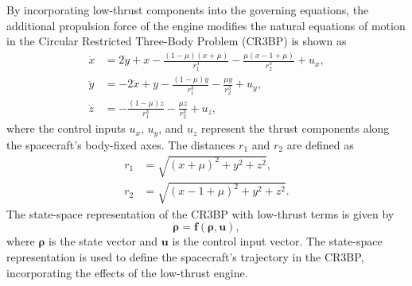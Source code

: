 \documentclass[conference]{IEEEtran}
\begin{document}
 By incorporating low-thrust components into the governing equations, the additional propulsion force of the engine modifies the natural equations of motion in the Circular Restricted Three-Body Problem (CR3BP) is shown as	
\begin{align}
		\ddot{x} &= 2\dot{y} + x - \frac{(1-\mu)(x+\mu)}{r_1^3} - \frac{\mu(x-1+\mu)}{r_2^3} + u_x, \\
		\ddot{y} &= -2\dot{x} + y - \frac{(1-\mu)y}{r_1^3} - \frac{\mu y}{r_2^3} + u_y, \\
		\ddot{z} &= -\frac{(1-\mu)z}{r_1^3} - \frac{\mu z}{r_2^3} + u_z,
\end{align}
where the control inputs \( u_x \), \( u_y \), and \( u_z \) represent the thrust components along the spacecraft's body-fixed axes. The distances \( r_1 \) and \( r_2 \) are defined as
\begin{align}
	r_1 &= \sqrt{(x+\mu)^2 + y^2 + z^2}, \\
	r_2 &= \sqrt{(x-1+\mu)^2 + y^2 + z^2}.
\end{align}
The state-space representation of the CR3BP with low-thrust terms is given by
\begin{equation}
	\dot{\boldsymbol{\rho}} = \boldsymbol{f}(\boldsymbol{\rho}, \boldsymbol{u}),
\end{equation}
where \( \boldsymbol{\rho} \) is the state vector and \( \boldsymbol{u} \) is the control input vector. The state-space representation is used to define the spacecraft's trajectory in the CR3BP, incorporating the effects of the low-thrust engine.
\end{document}
